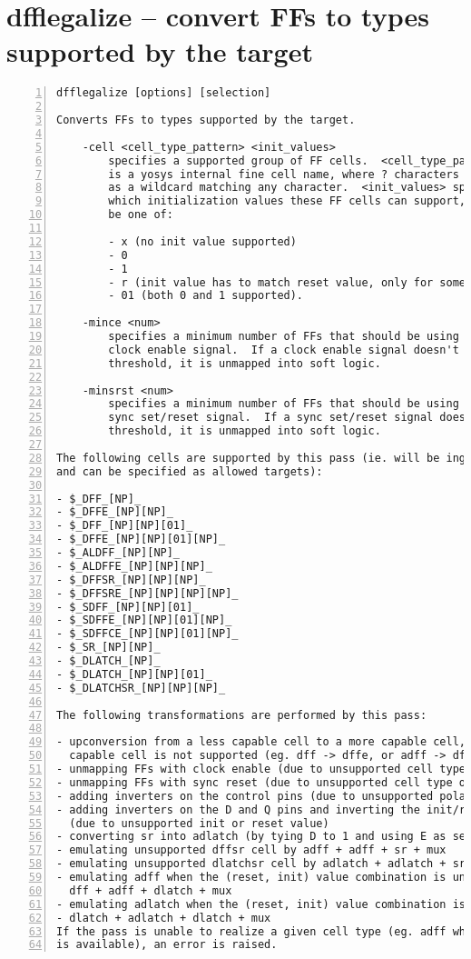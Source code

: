 \section{dfflegalize -- convert FFs to types supported by the target}
\label{cmd:dfflegalize}
\begin{lstlisting}[numbers=left,frame=single]
    dfflegalize [options] [selection]

Converts FFs to types supported by the target.

    -cell <cell_type_pattern> <init_values>
        specifies a supported group of FF cells.  <cell_type_pattern>
        is a yosys internal fine cell name, where ? characters can be
        as a wildcard matching any character.  <init_values> specifies
        which initialization values these FF cells can support, and can
        be one of:

        - x (no init value supported)
        - 0
        - 1
        - r (init value has to match reset value, only for some FF types)
        - 01 (both 0 and 1 supported).

    -mince <num>
        specifies a minimum number of FFs that should be using any given
        clock enable signal.  If a clock enable signal doesn't meet this
        threshold, it is unmapped into soft logic.

    -minsrst <num>
        specifies a minimum number of FFs that should be using any given
        sync set/reset signal.  If a sync set/reset signal doesn't meet this
        threshold, it is unmapped into soft logic.

The following cells are supported by this pass (ie. will be ingested,
and can be specified as allowed targets):

- $_DFF_[NP]_
- $_DFFE_[NP][NP]_
- $_DFF_[NP][NP][01]_
- $_DFFE_[NP][NP][01][NP]_
- $_ALDFF_[NP][NP]_
- $_ALDFFE_[NP][NP][NP]_
- $_DFFSR_[NP][NP][NP]_
- $_DFFSRE_[NP][NP][NP][NP]_
- $_SDFF_[NP][NP][01]_
- $_SDFFE_[NP][NP][01][NP]_
- $_SDFFCE_[NP][NP][01][NP]_
- $_SR_[NP][NP]_
- $_DLATCH_[NP]_
- $_DLATCH_[NP][NP][01]_
- $_DLATCHSR_[NP][NP][NP]_

The following transformations are performed by this pass:

- upconversion from a less capable cell to a more capable cell, if the less
  capable cell is not supported (eg. dff -> dffe, or adff -> dffsr)
- unmapping FFs with clock enable (due to unsupported cell type or -mince)
- unmapping FFs with sync reset (due to unsupported cell type or -minsrst)
- adding inverters on the control pins (due to unsupported polarity)
- adding inverters on the D and Q pins and inverting the init/reset values
  (due to unsupported init or reset value)
- converting sr into adlatch (by tying D to 1 and using E as set input)
- emulating unsupported dffsr cell by adff + adff + sr + mux
- emulating unsupported dlatchsr cell by adlatch + adlatch + sr + mux
- emulating adff when the (reset, init) value combination is unsupported by
  dff + adff + dlatch + mux
- emulating adlatch when the (reset, init) value combination is unsupported by
- dlatch + adlatch + dlatch + mux
If the pass is unable to realize a given cell type (eg. adff when only plain dff
is available), an error is raised.
\end{lstlisting}

